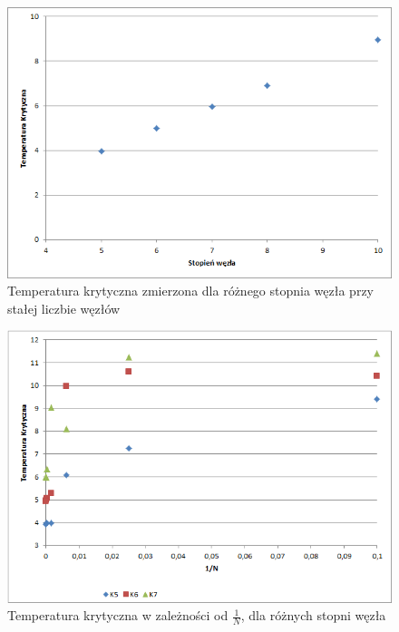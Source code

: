 \documentclass[12pt,a4paper]{article}
\begin{document}
\begin{figure}
\includegraphics[width=\textwidth]{TodK.png}
\caption{Temperatura krytyczna zmierzona dla różnego stopnia węzła przy stałej liczbie węzłów}
\label{fig:TcOdK}
\end{figure}

\begin{figure}
\includegraphics[width=\textwidth]{K5K6K7.png}
\caption{Temperatura krytyczna w zależności od $\frac{1}{N}$, dla różnych stopni węzła}
\label{fig:TcOd1/N.1}
\end{figure}
\end{document}
